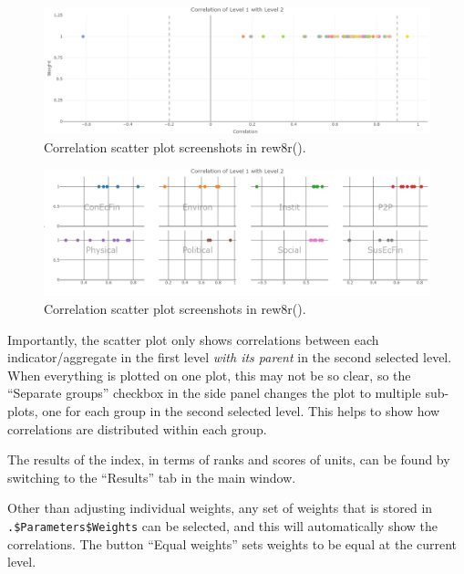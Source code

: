 \documentclass[
]{book}
\begin{document}
\begin{figure}

{\centering \includegraphics[width=1\linewidth]{images/corr_scat_screenshot_rew8r} 

}

\caption{Correlation scatter plot screenshots in rew8r().}\label{fig:unnamed-chunk-47-1}
\end{figure}
\begin{figure}

{\centering \includegraphics[width=1\linewidth]{images/corr_scat_sep_screenshot_rew8r} 

}

\caption{Correlation scatter plot screenshots in rew8r().}\label{fig:unnamed-chunk-47-2}
\end{figure}

Importantly, the scatter plot only shows correlations between each indicator/aggregate in the first level \emph{with its parent} in the second selected level. When everything is plotted on one plot, this may not be so clear, so the ``Separate groups'' checkbox in the side panel changes the plot to multiple sub-plots, one for each group in the second selected level. This helps to show how correlations are distributed within each group.

The results of the index, in terms of ranks and scores of units, can be found by switching to the ``Results'' tab in the main window.

Other than adjusting individual weights, any set of weights that is stored in \texttt{.\$Parameters\$Weights} can be selected, and this will automatically show the correlations. The button ``Equal weights'' sets weights to be equal at the current level.
\end{document}
